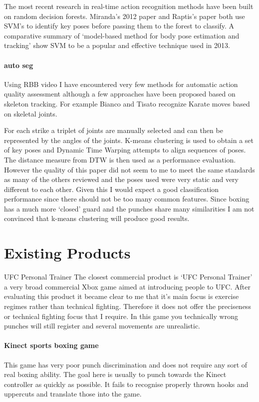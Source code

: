 The most recent research in real-time action recognition methods have been built on random decision forests.\cite{randforest} \cite{Miranda2014} Miranda's 2012 paper\cite{Miranda2012}  and Raptis's paper \cite{Raptis2011a} both use SVM's to identify key poses before passing them to the forest to classify. A comparative summary of `model-based method for body pose estimation and tracking'\cite{Manjuatha2014} show SVM to be a popular and effective technique used in 2013.


 \paragraph{auto seg}
 Using RBB video I have encountered very few methods for automatic action quality assessment although a few approaches have been proposed based on skeleton tracking. 
For example Bianco and Tisato recognize Karate moves based on skeletal joints.\cite{karate}

For each strike a triplet of joints are manually selected and can then be represented by the angles of the joints. K-means clustering is used to obtain a set of key poses and Dynamic Time Warping attempts to align sequences of poses. The distance measure from DTW is then used as a performance evaluation. However the quality of this paper did not seem to me to meet the same standards as many of the others reviewed and the poses used were very static and very different to each other.
Given this I would expect a good classification performance since there should not be too many common features. Since boxing has a much more `closed' guard and the punches share many similarities I am not convinced that k-means clustering will produce good results.


\section{Existing Products}
\par{UFC Personal Trainer}
The closest commercial product is `UFC Personal Trainer' a very broad commercial Xbox game aimed at introducing people to UFC. After evaluating this product it became clear to me that it’s main focus is  exercise regimes rather than technical fighting. Therefore it does not offer the preciseness or technical fighting focus that I require. In this game you technically wrong punches will still register and several movements are unrealistic.

\paragraph{Kinect sports boxing game}
This game has very poor punch discrimination and does not require any sort of real boxing ability. The goal here is usually to punch towards the Kinect controller as quickly as possible. It fails to recognise properly thrown hooks and uppercuts and translate those into the game. 

